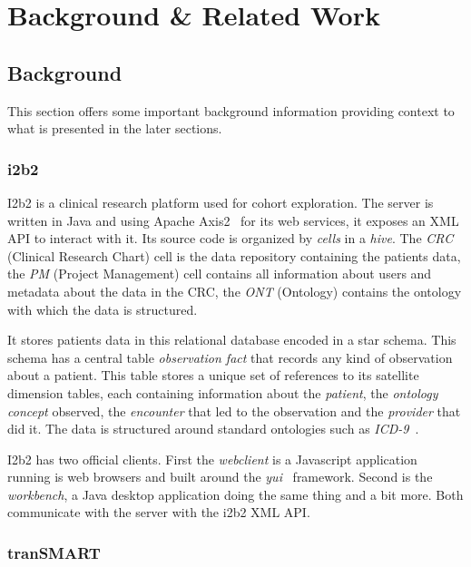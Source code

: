 \chapter{Background \& Related Work}
\label{sec:bg-relwork}

\section{Background}
This section offers some important background information providing context to what is presented in the later sections. 

\subsection{i2b2}
\label{sec:bg-i2b2}

I2b2 is a clinical research platform used for cohort exploration.
The server is written in Java and using Apache Axis2~\cite{axis2} for its web services, it exposes an XML API to interact with it.
Its source code is organized by \emph{cells} in a \emph{hive}.
The \emph{CRC} (Clinical Research Chart) cell is the data repository containing the patients data, the \emph{PM} (Project Management) cell contains all information about users and metadata about the data in the CRC, the \emph{ONT} (Ontology) contains the ontology with which the data is structured.

It stores patients data in this relational database encoded in a star schema.
This schema has a central table \emph{observation fact} that records any kind of observation about a patient.
This table stores a unique set of references to its satellite dimension tables, each containing information about the \emph{patient}, the \emph{ontology concept} observed, the \emph{encounter} that led to the observation and the \emph{provider} that did it.
The data is structured around standard ontologies such as \emph{ICD-9}~\cite{nahler2009icd}.

I2b2 has two official clients.
First the \emph{webclient} is a Javascript application running is web browsers and built around the \emph{yui}~\cite{yui} framework.
Second is the \emph{workbench}, a Java desktop application doing the same thing and a bit more.
Both communicate with the server with the i2b2 XML API.

\subsection{tranSMART}

